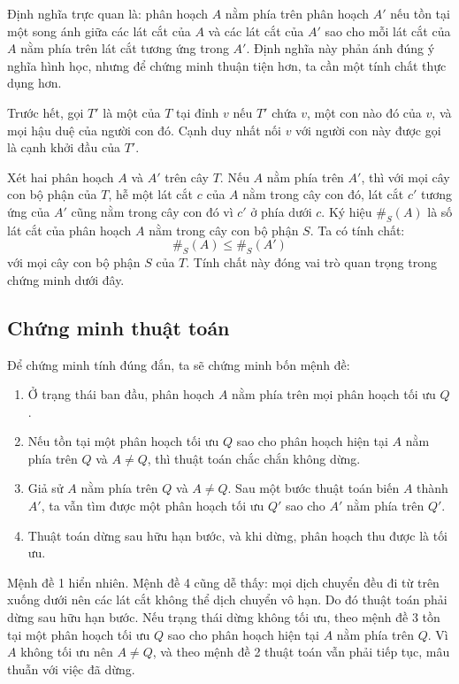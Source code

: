 \documentclass[11pt]{article}
\begin{document}
Định nghĩa trực quan là: phân hoạch $A$ nằm phía trên phân hoạch $A'$ nếu tồn
tại một song ánh giữa các lát cắt của $A$ và các lát cắt của $A'$ sao cho mỗi
lát cắt của $A$ nằm phía trên lát cắt tương ứng trong $A'$. Định nghĩa này
phản ánh đúng ý nghĩa hình học, nhưng để chứng minh thuận tiện hơn, ta cần
một tính chất thực dụng hơn.

Trước hết, gọi $T'$ là một  của $T$ tại đỉnh $v$ nếu
$T'$ chứa $v$, một con nào đó của $v$, và mọi hậu duệ của người con đó. Cạnh
duy nhất nối $v$ với người con này được gọi là cạnh khởi đầu của $T'$.

Xét hai phân hoạch $A$ và $A'$ trên cây $T$. Nếu $A$ nằm phía trên $A'$, thì
với mọi cây con bộ phận của $T$, hễ một lát cắt $c$ của $A$ nằm trong cây con
đó, lát cắt $c'$ tương ứng của $A'$ cũng nằm trong cây con đó vì $c'$ ở phía
dưới $c$. Ký hiệu $\#_S(A)$ là số lát cắt của phân hoạch $A$ nằm trong cây con
bộ phận $S$. Ta có tính chất:
\[
  \#_S(A)\le \#_S(A')
\]
với mọi cây con bộ phận $S$ của $T$. Tính chất này đóng vai trò quan trọng
trong chứng minh dưới đây.

\subsection{Chứng minh thuật toán}

Để chứng minh tính đúng đắn, ta sẽ chứng minh bốn mệnh đề:
\begin{enumerate}
  \item Ở trạng thái ban đầu, phân hoạch $A$ nằm phía trên mọi phân hoạch tối
  ưu $Q$.
  \item Nếu tồn tại một phân hoạch tối ưu $Q$ sao cho phân hoạch hiện tại $A$
  nằm phía trên $Q$ và $A\ne Q$, thì thuật toán chắc chắn không dừng.
  \item Giả sử $A$ nằm phía trên $Q$ và $A\ne Q$. Sau một bước thuật toán biến
  $A$ thành $A'$, ta vẫn tìm được một phân hoạch tối ưu $Q'$ sao cho $A'$ nằm
  phía trên $Q'$.
  \item Thuật toán dừng sau hữu hạn bước, và khi dừng, phân hoạch thu được là
  tối ưu.
\end{enumerate}

Mệnh đề 1 hiển nhiên. Mệnh đề 4 cũng dễ thấy: mọi dịch chuyển đều đi từ trên
xuống dưới nên các lát cắt không thể dịch chuyển vô hạn. Do đó thuật toán
phải dừng sau hữu hạn bước. Nếu trạng thái dừng không tối ưu, theo mệnh đề 3
tồn tại một phân hoạch tối ưu $Q$ sao cho phân hoạch hiện tại $A$ nằm phía
trên $Q$. Vì $A$ không tối ưu nên $A\ne Q$, và theo mệnh đề 2 thuật toán vẫn
phải tiếp tục, mâu thuẫn với việc đã dừng.
\end{document}
